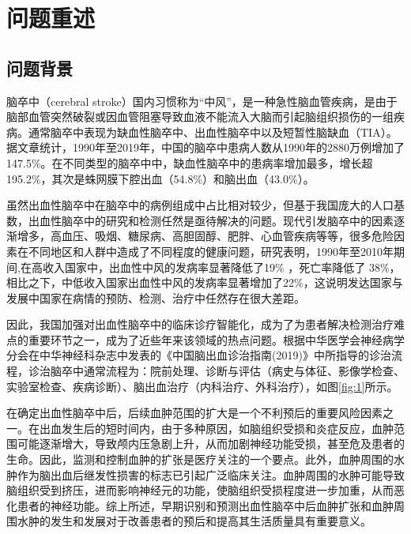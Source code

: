 \documentclass[bwprint]{gmcmthesis}
\begin{document}
	\pagestyle{plain}
	
	\maketoc
	
	\clearpage
	
	\section{问题重述}
		\subsection{问题背景}   %
		
			脑卒中（cerebral stroke）国内习惯称为“中风”，是一种急性脑血管疾病，是由于脑部血管突然破裂或因血管阻塞导致血液不能流入大脑而引起脑组织损伤的一组疾病。通常脑卒中表现为缺血性脑卒中、出血性脑卒中以及短暂性脑缺血（TIA）。据文章\cite{ma2021temporal}统计，1990年至2019年，中国的脑卒中患病人数从1990年的2880万例增加了147.5\%。在不同类型的脑卒中中，缺血性脑卒中的患病率增加最多，增长超195.2\%，其次是蛛网膜下腔出血（54.8\%）和脑出血（43.0\%）。
			
			虽然出血性脑卒中在脑卒中的病例组成中占比相对较少，但基于我国庞大的人口基数，出血性脑卒中的研究和检测任然是亟待解决的问题。现代引发脑卒中的因素逐渐增多，高血压、吸烟、糖尿病、高胆固醇、肥胖、心血管疾病等等，很多危险因素在不同地区和人群中造成了不同程度的健康问题，研究表明\cite{feigin2014global}，1990年至2010年期间,在高收入国家中，出血性中风的发病率显著降低了19\% ，死亡率降低了 38\%，相比之下，中低收入国家出血性中风的发病率显著增加了22\%，这说明发达国家与发展中国家在病情的预防、检测、治疗中任然存在很大差距。
			
			因此，我国加强对出血性脑卒中的临床诊疗智能化，成为了为患者解决检测治疗难点的重要环节之一，成为了近些年来该领域的热点问题。根据中华医学会神经病学分会在中华神经科杂志中发表的《中国脑出血诊治指南(2019)》\cite{strock2019bib}中所指导的诊治流程，诊治脑卒中通常流程为：院前处理、诊断与评估（病史与体征、影像学检查、实验室检查、疾病诊断）、脑出血治疗（内科治疗、外科治疗），如图\ref{fig:1}所示。
			
			在确定出血性脑卒中后，后续血肿范围的扩大是一个不利预后的重要风险因素之一。在出血发生后的短时间内，由于多种原因，如脑组织受损和炎症反应，血肿范围可能逐渐增大，导致颅内压急剧上升，从而加剧神经功能受损，甚至危及患者的生命。因此，监测和控制血肿的扩张是医疗关注的一个要点。此外，血肿周围的水肿作为脑出血后继发性损害的标志已引起广泛临床关注。血肿周围的水肿可能导致脑组织受到挤压，进而影响神经元的功能，使脑组织受损程度进一步加重，从而恶化患者的神经功能。综上所述，早期识别和预测出血性脑卒中后血肿扩张和血肿周围水肿的发生和发展对于改善患者的预后和提高其生活质量具有重要意义。
			
\end{document}
